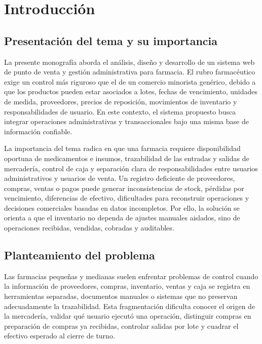 \chapter{Introducción}

\section{Presentación del tema y su importancia}

La presente monografía aborda el análisis, diseño y desarrollo de un sistema web de punto de venta y gestión administrativa para farmacia. El rubro farmacéutico exige un control más riguroso que el de un comercio minorista genérico, debido a que los productos pueden estar asociados a lotes, fechas de vencimiento, unidades de medida, proveedores, precios de reposición, movimientos de inventario y responsabilidades de usuario. En este contexto, el sistema propuesto busca integrar operaciones administrativas y transaccionales bajo una misma base de información confiable.

La importancia del tema radica en que una farmacia requiere disponibilidad oportuna de medicamentos e insumos, trazabilidad de las entradas y salidas de mercadería, control de caja y separación clara de responsabilidades entre usuarios administrativos y usuarios de venta. Un registro deficiente de proveedores, compras, ventas o pagos puede generar inconsistencias de stock, pérdidas por vencimiento, diferencias de efectivo, dificultades para reconstruir operaciones y decisiones comerciales basadas en datos incompletos. Por ello, la solución se orienta a que el inventario no dependa de ajustes manuales aislados, sino de operaciones recibidas, vendidas, cobradas y auditables.

\section{Planteamiento del problema}

Las farmacias pequeñas y medianas suelen enfrentar problemas de control cuando la información de proveedores, compras, inventario, ventas y caja se registra en herramientas separadas, documentos manuales o sistemas que no preservan adecuadamente la trazabilidad. Esta fragmentación dificulta conocer el origen de la mercadería, validar qué usuario ejecutó una operación, distinguir compras en preparación de compras ya recibidas, controlar salidas por lote y cuadrar el efectivo esperado al cierre de turno.

